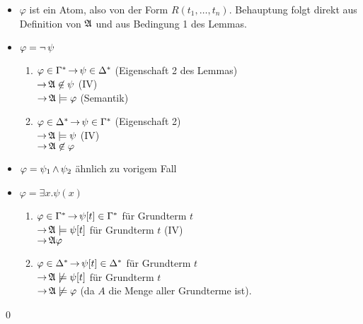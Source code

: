 \begin{itemize}
  \item $\varphi$ ist ein Atom, also von der Form $R(t_1,\dots,t_n)$.
  Behauptung folgt direkt aus Definition von $\mathfrak{A}$ und aus Bedingung 1 des Lemmas.
  
  \item $\varphi = \operatorname{\neg}\psi$
  \begin{enumerate}
    \item $\varphi\in\Gamma^*\operatorname{\rightarrow}\psi\in\Delta^*$ (Eigenschaft 2 des Lemmas)\\
                            $\operatorname{\rightarrow}\mathfrak{A}\not\in\psi$ (IV)\\
                            $\operatorname{\rightarrow}\mathfrak{A}\models\varphi$ (Semantik)
    \item $\varphi\in\Delta^*\operatorname{\rightarrow}\psi\in\Gamma^*$ (Eigenschaft 2)\\
                            $\operatorname{\rightarrow}\mathfrak{A}\models\psi$ (IV)\\
                            $\operatorname{\rightarrow}\mathfrak{A}\not\in\varphi$
  \end{enumerate}

  \item $\varphi=\psi_1\operatorname{\wedge}\psi_2$      ähnlich zu vorigem Fall
  
  \item $\varphi=\exists x.\psi(x)$
  \begin{enumerate}
    \item $\varphi\in\Gamma^*\operatorname{\rightarrow}\psi[t]\in\Gamma^*$ für Grundterm $t$\\
                            $\operatorname{\rightarrow}\mathfrak{A}\models\psi[t]$ für Grundterm $t$ (IV)\\
                            $\operatorname{\rightarrow}\mathfrak{A}\varphi$
                          
    \item $\varphi\in\Delta^*\operatorname{\rightarrow}\psi[t]\in\Delta^*$ für Grundterm $t$\\
                            $\operatorname{\rightarrow}\mathfrak{A}\not\models\psi[t]$ für Grundterm $t$\\
                            $\operatorname{\rightarrow}\mathfrak{A}\not\models\varphi$ (da $A$ die Menge aller Grundterme ist).
  \end{enumerate}
\end{itemize}
\qed
